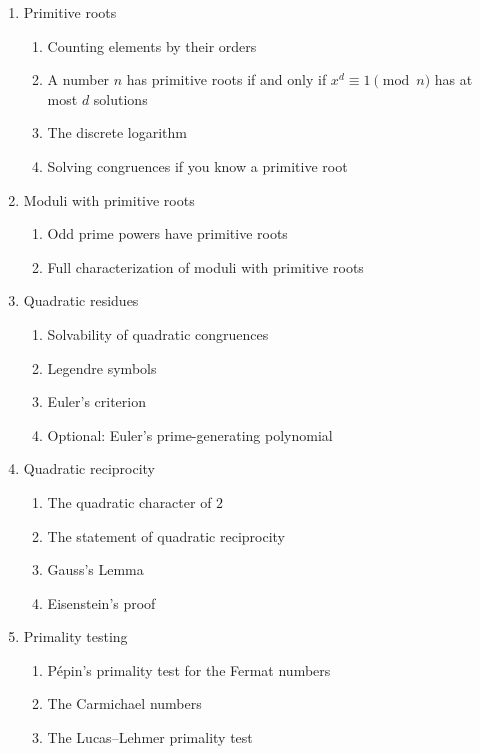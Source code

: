 \documentclass{article}
\begin{document}
\begin{enumerate}
\item Primitive roots
  \begin{enumerate}
  \item Counting elements by their orders
  \item A number $n$ has primitive roots if and only if $x^d\equiv 1\pmod{n}$ has at most $d$ solutions
  \item The discrete logarithm
  \item Solving congruences if you know a primitive root
  \end{enumerate}
\item Moduli with primitive roots
  \begin{enumerate}
  \item Odd prime powers have primitive roots
  \item Full characterization of moduli with primitive roots
  \end{enumerate}
\item Quadratic residues
  \begin{enumerate}
  \item Solvability of quadratic congruences
  \item Legendre symbols
  \item Euler's criterion
  \item Optional: Euler's prime-generating polynomial
  \end{enumerate}
\item Quadratic reciprocity
  \begin{enumerate}
  \item The quadratic character of $2$
  \item The statement of quadratic reciprocity
  \item Gauss's Lemma
  \item Eisenstein's proof
  \end{enumerate}
\item Primality testing
  \begin{enumerate}
  \item P\'epin's primality test for the Fermat numbers
  \item The Carmichael numbers
  \item The Lucas--Lehmer primality test
  \end{enumerate}
\end{enumerate}
\endgroup
\end{document}
